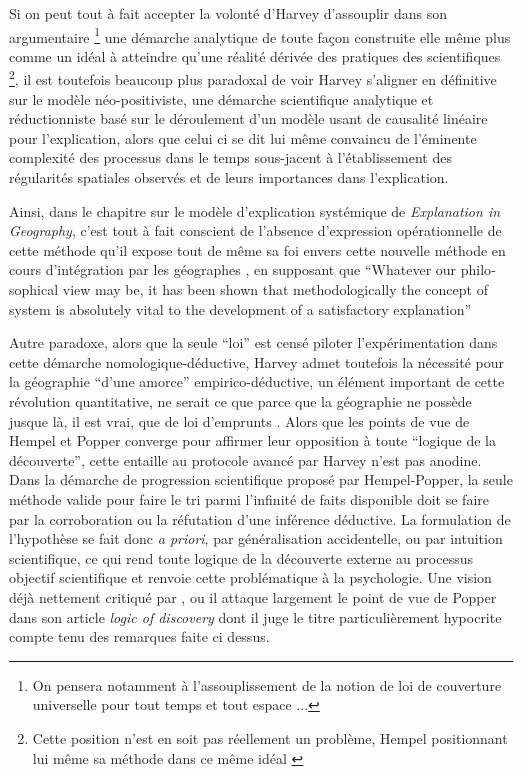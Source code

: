 Si on peut tout à fait accepter la volonté d'Harvey d'assouplir dans son argumentaire \footnote{On pensera notamment à l'assouplissement de la notion de loi de couverture universelle pour tout temps et tout espace ... } une démarche analytique de toute façon construite elle même plus comme un idéal à atteindre qu'une réalité dérivée des pratiques des scientifiques \footnote{Cette position n'est en soit pas réellement un problème, Hempel positionnant lui même sa méthode dans ce même idéal \autocite{Besse2000}}, il est toutefois beaucoup plus paradoxal de voir Harvey s'aligner en définitive sur le modèle néo-positiviste, une démarche scientifique analytique et réductionniste \autocite[57-59]{Paterson1984} basé sur le déroulement d'un modèle usant de causalité linéaire pour l'explication, alors que celui ci se dit lui même convaincu de l'éminente complexité des processus dans le temps sous-jacent à l'établissement des régularités spatiales observés et de leurs importances dans l'explication.

Ainsi, dans le chapitre sur le modèle d'explication systémique de \textit{Explanation in Geography}, c'est tout à fait conscient de l'absence d'expression opérationnelle de cette méthode qu'il expose tout de même sa foi envers cette nouvelle méthode en cours d'intégration par les géographes \autocite[449,469]{Harvey1969}, en supposant que \foreignquote{english}{Whatever our philosophical view may be, it has been shown that methodologically the concept of system is absolutely vital to the development of a satisfactory explanation} \autocite[479]{Harvey1969}

Autre paradoxe, alors que la seule \enquote{loi} est censé piloter l’expérimentation dans cette démarche nomologique-déductive, Harvey admet toutefois la nécessité pour la géographie \enquote{d'une amorce} empirico-déductive, un élément important de cette révolution quantitative, ne serait ce que parce que la géographie ne possède jusque là, il est vrai, que de loi d'emprunts \autocite[41-42]{Harvey1969}. Alors que les points de vue de Hempel et Popper converge pour affirmer leur opposition à toute \enquote{logique de la découverte}, cette entaille au protocole avancé par Harvey n'est pas anodine. Dans la démarche de progression scientifique proposé par Hempel-Popper, la seule méthode valide pour faire le tri parmi l'infinité de faits disponible doit se faire par la corroboration ou la réfutation d'une inférence déductive. La formulation de l'hypothèse se fait donc \textit{a priori}, par généralisation accidentelle, ou par intuition scientifique, ce qui rend toute logique de la découverte externe au processus objectif scientifique et renvoie cette problématique à la psychologie. Une vision déjà nettement critiqué par \textcite{Simon1973}, ou il attaque largement le point de vue de Popper dans son article \textit{logic of discovery} dont il juge le titre particulièrement hypocrite compte tenu des remarques faite ci dessus. 


